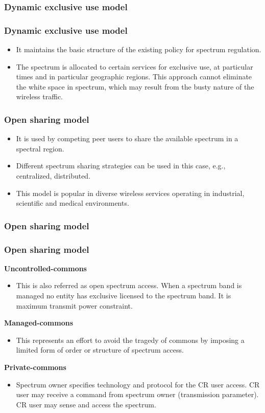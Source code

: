 \documentclass{beamer}
\begin{document}
\subsubsection{Dynamic exclusive use model}
\begin{frame}
\frametitle{Dynamic exclusive use model}
\begin{itemize}
\item It maintains the basic structure of the existing policy for spectrum regulation.\\
\item The spectrum is allocated to certain services for exclusive use, at particular times and in particular geographic regions. This approach cannot eliminate the white space in spectrum, which may result from the busty nature of the wireless traffic.
\end{itemize}

\end{frame}

\begin{frame}
\frametitle{Open sharing model}
\begin{itemize}
\item It is used by competing peer users to share the available spectrum in a spectral region. 
\item Different spectrum sharing strategies can be used in this case, e.g., centralized, distributed. 
\item This model is popular in diverse wireless services operating in industrial, scientific and medical environments.

\end{itemize}

\end{frame}

\subsubsection{Open sharing model}
\begin{frame}
\frametitle{Open sharing model}

\textbf{Uncontrolled-commons}
\begin{itemize}
\item This is also referred as open spectrum access. When a spectrum band is managed no entity has exclusive licensed to the spectrum band. It is maximum transmit power constraint.
\end{itemize}
\textbf{Managed-commons}
\begin{itemize}
\item This represents an effort to avoid the tragedy of commons by imposing a limited form of order or structure of spectrum access.
\end{itemize}
\textbf{Private-commons}
\begin{itemize}
\item Spectrum owner specifies technology and protocol for the CR user access.
CR user may receive a command from spectrum owner (transmission parameter). CR user may sense and access the spectrum.
\end{itemize}

\end{frame}
\end{document}
